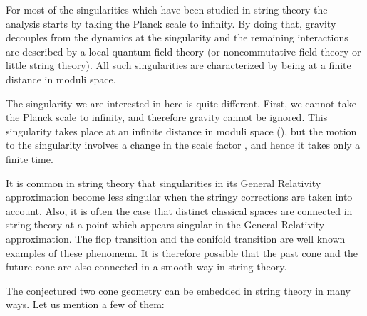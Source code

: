 \documentclass[a4paper,12pt,oneside]{article}
\begin{document}
For most of the singularities which have been studied in string
theory the analysis starts by taking the Planck scale to
infinity. By doing that, gravity decouples from the dynamics at
the singularity and the remaining interactions are described by a
local quantum field theory (or noncommutative field theory or
little string theory). All such singularities are characterized
by being at a finite distance in moduli space.

The singularity we are interested in here is quite different.
First, we cannot take the Planck scale to infinity, and therefore
gravity cannot be ignored. This singularity takes place at an
infinite distance in moduli space (\myHighlight{$\phi \to -\infty$}\coordHE{}), but the
motion to the singularity involves a change in the scale factor
\coordHE{}, and hence it takes only a finite time.

It is common in string theory that singularities in its General
Relativity approximation become less singular when the stringy
corrections are taken into account. Also, it is often the case
that distinct classical spaces are connected in string theory at a
point which appears singular in the General Relativity
approximation.  The flop transition \cite{flop} and the conifold
transition \cite{conifold} are well known examples of these
phenomena. It is therefore possible that the past cone and the
future cone are also connected in a smooth way in string theory.


The conjectured two cone geometry \coordHE{} can be embedded in
string theory in many ways.  Let us mention a few of them:
\end{document}
